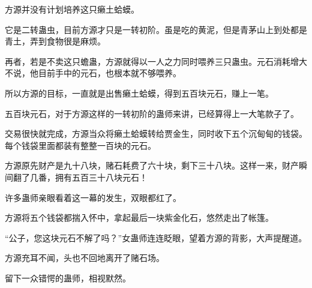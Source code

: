\begin{this_body}
方源并没有计划培养这只癞土蛤蟆。

它是二转蛊虫，目前方源才只是一转初阶。虽是吃的黄泥，但是青茅山上到处都是青土，弄到食物很是麻烦。

再者，若是不卖这只蟾蛊，方源就得以一人之力同时喂养三只蛊虫。元石消耗增大不说，他目前手中的元石，也根本就不够喂养。

所以方源的目标，一直就是出售癞土蛤蟆，得到五百块元石，赚上一笔。

五百块元石，对于方源这样的一转初阶的蛊师来讲，已经算得上一大笔款子了。

交易很快就完成，方源当众将癞土蛤蟆转给贾金生，同时收下五个沉甸甸的钱袋。每个钱袋里面都装有整整一百块的元石。

方源原先财产是九十八块，赌石耗费了六十块，剩下三十八块。这样一来，财产瞬间翻了几番，拥有五百三十八块元石！

许多蛊师亲眼看着这一幕的发生，双眼都红了。

方源将五个钱袋都揣入怀中，拿起最后一块紫金化石，悠然走出了帐篷。

“公子，您这块元石不解了吗？”女蛊师连连眨眼，望着方源的背影，大声提醒道。

方源充耳不闻，头也不回地离开了赌石场。

留下一众错愕的蛊师，相视默然。

\end{this_body}

